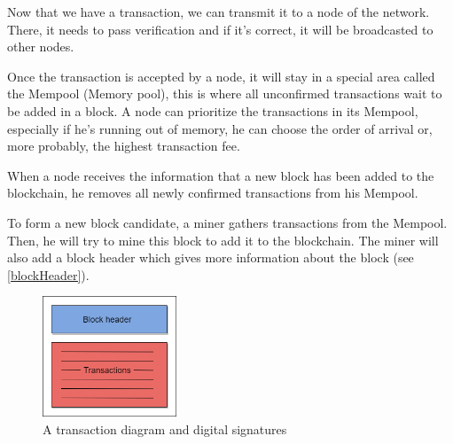Now that we have a transaction, we can transmit it to a node of the network. There, it needs to pass verification and if it's correct, it will be broadcasted to other nodes. \newline

Once the transaction is accepted by a node, it will stay in a special area called the Mempool (Memory pool), this is where all unconfirmed transactions wait to be added in a block. A node can prioritize the transactions in its Mempool, especially if he's running out of memory, he can choose the order of arrival or, more probably, the highest transaction fee.

When a node receives the information that a new block has been added to the blockchain, he removes all newly confirmed transactions from his Mempool.  \newline

To form a new block candidate, a miner gathers transactions from the Mempool. Then, he will try to mine this block to add it to the blockchain. The miner will also add a block header which gives more information about the block (see \ref{blockHeader}). \newline

\begin{figure}[ht]
\centering
\includegraphics[width=4cm]{Figures/block}
\caption{A transaction diagram and digital signatures}
\end{figure}
\medskip

